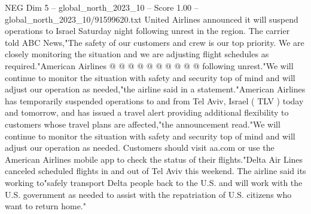 \begin{textsample}{NEG Dim 5 – global\_north\_2023\_10 – Score 1.00 – global\_north\_2023\_10/91599620.txt}
United Airlines announced it will suspend operations to Israel Saturday night following unrest in the region.
The carrier told ABC News,"The safety of our customers and crew is our top priority.
We are closely monitoring the situation and we are adjusting flight schedules as required."American Airlines @ @ @ @ @ @ @ @ @ @ following unrest."We will continue to monitor the situation with safety and security top of mind and will adjust our operation as needed,"the airline said in a statement."American Airlines has temporarily suspended operations to and from Tel Aviv, Israel ( TLV ) today and tomorrow, and has issued a travel alert providing additional flexibility to customers whose travel plans are affected,"the announcement read."We will continue to monitor the situation with safety and security top of mind and will adjust our operation as needed.
Customers should visit aa.com or use the American Airlines mobile app to check the status of their flights."Delta Air Lines canceled scheduled flights in and out of Tel Aviv this weekend.
The airline said its working to"safely transport Delta people back to the U.S. and will work with the U.S. government as needed to assist with the repatriation of U.S. citizens who want to return home."

\end{textsample}
